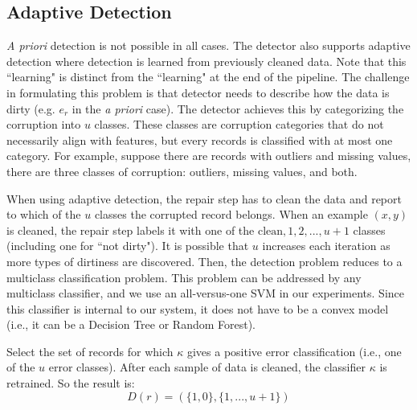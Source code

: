 \subsection{Adaptive Detection}
\emph{A priori} detection is not possible in all cases.
The detector also supports adaptive detection where detection is learned from previously cleaned data.
Note that this ``learning" is distinct from the ``learning" at the end of the pipeline.
The challenge in formulating this problem is that detector needs to describe how the data is dirty (e.g. $e_r$ in the \emph{a priori} case).
The detector achieves this by categorizing the corruption into $u$ classes.
These classes are corruption categories that do not necessarily align with features, but every records is classified with at most one category.
For example, suppose there are records with outliers and missing values, there are three classes of corruption: outliers, missing values, and both.

When using adaptive detection, the repair step has to clean the data and report to which of the $u$ classes the corrupted record belongs.
When an example $(x,y)$ is cleaned, the repair step labels it with one of the ${\text{clean}, 1,2,...,u+1}$ classes (including one for ``not dirty").
It is possible that $u$ increases each iteration as more types of dirtiness are discovered. 
Then, the detection problem reduces to a multiclass classification problem.
This problem can be addressed by any multiclass classifier, and we use an all-versus-one SVM in our experiments.
Since this classifier is internal to our system, it does not have to be a convex model (i.e., it can be a Decision Tree or Random Forest).

\begin{definition}
Select the set of records for which $\kappa$ gives a positive error classification (i.e., one of the $u$ error classes).
After each sample of data is cleaned, the classifier $\kappa$ is retrained.
So the result is:
\[D(r) = (\{1,0\},\{1,...,u+1\})\]
\end{definition}

\vspace{0.75em}

